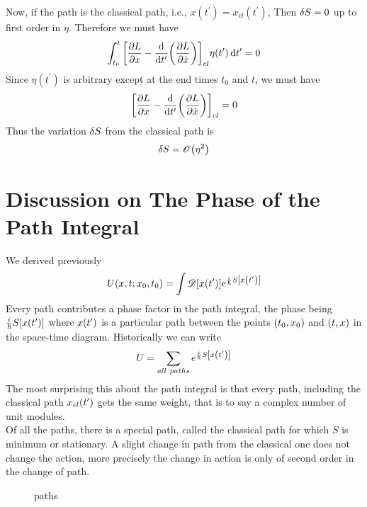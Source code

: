 		Now, if the path is the classical path, i.e., $x(t^\prime) = x_{cl}(t^\prime)$, Then $\var{S} = 0$ up to first order in $\eta$. Therefore we must have
		\begin{equation}
			\int_{t_0}^{t} \qty[\pdv{L}{x}  -
			\dv{t^\prime}\qty(\pdv{L}{\dot{x}})]_{cl} \eta\qty(t^\prime) \dd{t^\prime} = 0
		\end{equation}
		Since $\eta(t^\prime)$ is arbitrary except at the end times $t_0$ and $t$, we must have
		\begin{equation}
			\qty[\pdv{L}{x}  -
			\dv{t^\prime}\qty(\pdv{L}{\dot{x}})]_{cl} = 0
		\end{equation}
		Thus the variation $\var{S}$ from the classical path is 
		\begin{equation}
			\var{S} = \order{\eta^2}
		\end{equation}
		
		
		
		\section{Discussion on The Phase of the Path Integral}
		We derived previously
		\begin{equation}
			U\qty(x,t;x_0, t_0) = \int \mathcal{D}\qty[x\qty(t^\prime)] e^{\frac{{i\mkern1mu}}{\hbar} S\qty[x\qty(t^\prime)]}
		\end{equation}
		Every path contributes a phase factor in the path integral, the phase being $\frac{{i\mkern1mu}}{\hbar} S\qty[x\qty(t^\prime)]$ where $x\qty(t^\prime)$ is a particular path between the points $\qty(t_0, x_0)$ and $\qty(t,x)$ in the space-time diagram. Historically we can write
		\begin{equation}
			U = \sum_{all\ paths} e^{\frac{{i\mkern1mu}}{\hbar} S\qty[x\qty(t^\prime)]}
		\end{equation}
		The most surprising this about the path integral is that every path, including the classical path $x_{cl}\qty(t^\prime)$ gets the same weight, that is to say a complex number of unit modules.\\
		
		
		Of all the paths, there is a special path, called the classical path for which $S$ is minimum or stationary. A slight change in path from the classical one does not change the action, more precisely the change in action is only of second order in the change of path.
		
		
		\begin{figure}
			\caption{paths}
		\end{figure}
	
